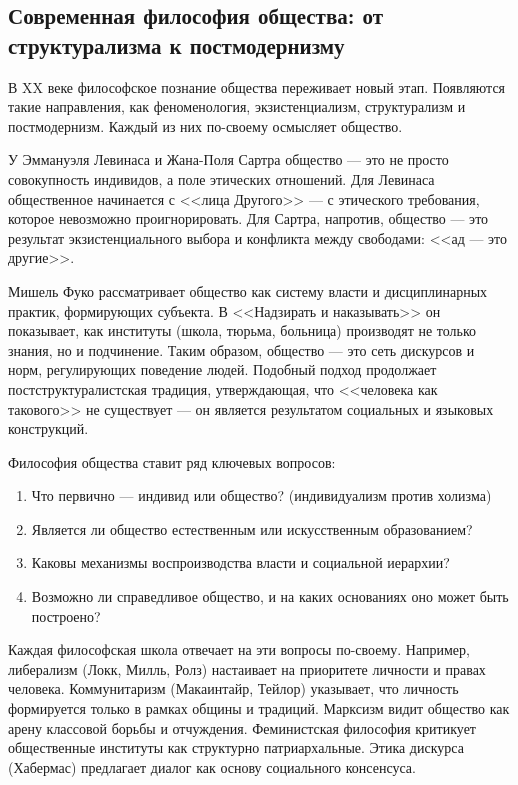 \documentclass[12pt,a4paper]{article}
\begin{document}
	\subsection{Современная философия общества: от структурализма к постмодернизму}
	В XX веке философское познание общества переживает новый этап. Появляются такие направления, как феноменология, экзистенциализм, структурализм и постмодернизм. Каждый из них по-своему осмысляет общество.
	
	У Эммануэля Левинаса и Жана-Поля Сартра общество — это не просто совокупность индивидов, а поле этических отношений. Для Левинаса общественное начинается с <<лица Другого>> — с этического требования, которое невозможно проигнорировать. Для Сартра, напротив, общество — это результат экзистенциального выбора и конфликта между свободами: <<ад — это другие>>.
	
	Мишель Фуко рассматривает общество как систему власти и дисциплинарных практик, формирующих субъекта. В <<Надзирать и наказывать>> он показывает, как институты (школа, тюрьма, больница) производят не только знания, но и подчинение. Таким образом, общество — это сеть дискурсов и норм, регулирующих поведение людей. Подобный подход продолжает постструктуралистская традиция, утверждающая, что <<человека как такового>> не существует — он является результатом социальных и языковых конструкций.
	
	Философия общества ставит ряд ключевых вопросов:
	\begin{enumerate}
		\item Что первично — индивид или общество? (индивидуализм против холизма)
		\item Является ли общество естественным или искусственным образованием?
		\item Каковы механизмы воспроизводства власти и социальной иерархии?
		\item Возможно ли справедливое общество, и на каких основаниях оно может быть построено?
	\end{enumerate}
	
	\par Каждая философская школа отвечает на эти вопросы по-своему. Например, либерализм (Локк, Милль, Ролз) настаивает на приоритете личности и правах человека. Коммунитаризм (Макаинтайр, Тейлор) указывает, что личность формируется только в рамках общины и традиций. Марксизм видит общество как арену классовой борьбы и отчуждения. Феминистская философия критикует общественные институты как структурно патриархальные. Этика дискурса (Хабермас) предлагает диалог как основу социального консенсуса.
	
\end{document}
